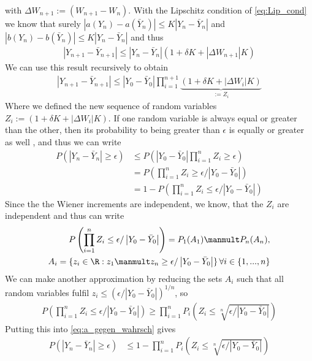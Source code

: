with $\Delta W_{n+1}:=(W_{n+1}-W_n)$. With the Lipschitz condition of \cref{eq:Lip_cond} we know that surely \mbox{$\left|a(Y_n)-a(\bar{Y}_n)\right|\leq K \left|Y_n-\bar{Y}_{n}\right|$} and \mbox{$\left|b(Y_n)-b(\bar{Y}_n)\right|\leq K \left|Y_n-\bar{Y}_{n}\right|$} and thus
\begin{align}
\left|Y_{n+1}-\bar{Y}_{n+1}\right|\leq \left|Y_n-\bar{Y}_{n}\right|(1+\delta K+|\Delta W_{n+1}|K)
\end{align}
We can use this result recursively to obtain
\begin{align}
\left|Y_{n+1}-\bar{Y}_{n+1}\right|\leq \left|Y_0-\bar{Y}_{0}\right|\prod_{i=1}^{n+1}\underbrace{(1+\delta K+|\Delta W_{i}|K)}_{:=Z_i}
\end{align}
Where we defined the new sequence of random variables $Z_i :=(1+\delta K+|\Delta W_{i}|K) $. If one random variable is always equal or greater than the other, then its probability to being greater than $\epsilon$ is equally or greater as well \cite[p.202]{cum_dist}, and thus we can write 
\begin{align}
P(\left|Y_{n}-\bar{Y}_{n}\right|\geq \epsilon)&\leq P\left(\left|Y_0-\bar{Y}_0\right|\prod_{i=1}^n Z_i \geq \epsilon\right)\\
& = P\left(\prod_{i=1}^n Z_i \geq \epsilon/\left|Y_0-\bar{Y}_0\right|\right)\\
& = 1 - P\left(\prod_{i=1}^n Z_i \leq \epsilon/\left|Y_0-\bar{Y}_0\right|\right)\label{eq:a_gegen_wahrsch}
\end{align}
Since the the Wiener increments are independent, we know, that the $Z_i$ are independent and thus can write
\begin{align}
P\left(\prod_{i=1}^n Z_i \leq \epsilon/\left|Y_0-\bar{Y}_0\right|\right) = P_1(A_1)\manmult P_n(A_n), \\
A_i = \{z_i\in\R:z_1\manmult z_n \geq \epsilon/\left|Y_0-\bar{Y}_0\right|\}\, \forall i \in \{1,...,n\}
\end{align}
We can make another approximation by reducing the sets $A_i$ such that all random variables fulfil $z_i\leq (\epsilon/\left|Y_0-\bar{Y}_0\right|)^{1/n}$, so 
\begin{align}
P\left(\prod_{i=1}^n Z_i \leq \epsilon/\left|Y_0-\bar{Y}_0\right|\right)  \geq \prod_{i=1}^n P_i\left(Z_i\leq \sqrt[n]{ \epsilon/\left|Y_0-\bar{Y}_0\right|}\right)
\end{align}
Putting this into \cref{eq:a_gegen_wahrsch} gives
\begin{align}
P(\left|Y_{n}-\bar{Y}_{n}\right|\geq \epsilon)&\leq 1 - \prod_{i=1}^n P_i\left(Z_i\leq \sqrt[n]{ \epsilon/\left|Y_0-\bar{Y}_0\right|}\right) \label{eq:a_absch_gegen_wahrsch}
\end{align}

